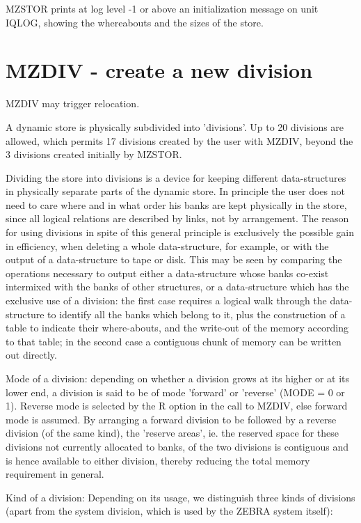 MZSTOR prints at log level -1 or above
an initialization message on unit IQLOG,
showing the whereabouts and the sizes of the store.

\section{MZDIV  - create a new division}

MZDIV may trigger relocation.

A dynamic store is physically subdivided into 'divisions'.
Up to 20 divisions are allowed, which permits 17 divisions
created by the user with MZDIV, beyond the 3 divisions
created initially by MZSTOR.

Dividing the store into divisions is a device for keeping
different data-structures in physically separate parts
of the dynamic store.
In principle the user does not need to care where and in what
order his banks are kept physically in the store,
since all logical relations are described by links,
not by arrangement.
The reason for using divisions in spite of this general principle
is exclusively the possible gain in efficiency,
when deleting a whole data-structure, for example,
or with the output of a data-structure to tape or disk.
This may be seen by comparing the operations necessary to output
either a data-structure whose banks co-exist intermixed with
the banks of other structures, or a data-structure which has
the exclusive use of a division:
the first case requires a logical walk through the data-structure
to identify all the banks which belong to it,
plus the construction of a table to indicate their where-abouts,
and the write-out of the memory according to that table;
in the second case a contiguous chunk of memory
can be written out directly.

Mode of a division:  depending on whether a division grows
at its higher or at its lower end,
a division is said to be of mode 'forward' or 'reverse'
(MODE = 0 or 1).
Reverse mode is selected by the R option in the call to MZDIV,
else forward mode is assumed.
By arranging a forward division to be followed by a reverse
division (of the same kind),
the 'reserve areas', ie. the reserved space for these divisions
not currently allocated to banks,
of the two divisions is contiguous and is hence available
to either division,
thereby reducing the total memory requirement in general.

Kind of a division:  Depending on its usage,
we distinguish three kinds of divisions (apart from the
system division, which is used by the ZEBRA system itself):

